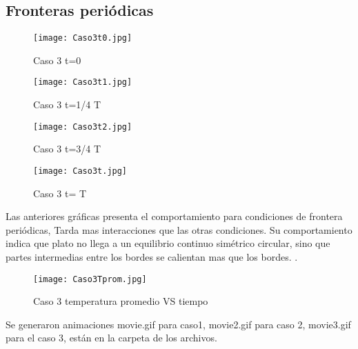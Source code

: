 \documentclass{article}
\begin{document}
\subsection{Fronteras periódicas}

\begin{figure}[h!]
\centering
\texttt{[image: Caso3t0.jpg]}
\caption{Caso 3 t=0}
\label{fig:9}
\end{figure}

\begin{figure}[h!]
\centering
\texttt{[image: Caso3t1.jpg]}
\caption{Caso 3 t=1/4 T}
\label{fig:10}
\end{figure}

\begin{figure}[h!]
\centering
\texttt{[image: Caso3t2.jpg]}
\caption{Caso 3 t=3/4 T}
\label{fig:11}
\end{figure}

\begin{figure}[h!]
\centering
\texttt{[image: Caso3t.jpg]}
\caption{Caso 3 t= T}
\label{fig:12}
\end{figure}

Las anteriores gráficas presenta el comportamiento para condiciones de frontera periódicas, Tarda mas interacciones que las otras condiciones. Su comportamiento indica que plato no llega a un equilibrio continuo simétrico circular, sino que partes intermedias entre los bordes se calientan mas que los bordes. .\\

\begin{figure}[h!]
\centering
\texttt{[image: Caso3Tprom.jpg]}
\caption{Caso 3 temperatura promedio VS tiempo}
\label{fig:15}
\end{figure}

Se generaron animaciones movie.gif para caso1, movie2.gif para caso 2, movie3.gif para el caso 3, están en la carpeta de los archivos.
\end{document}
